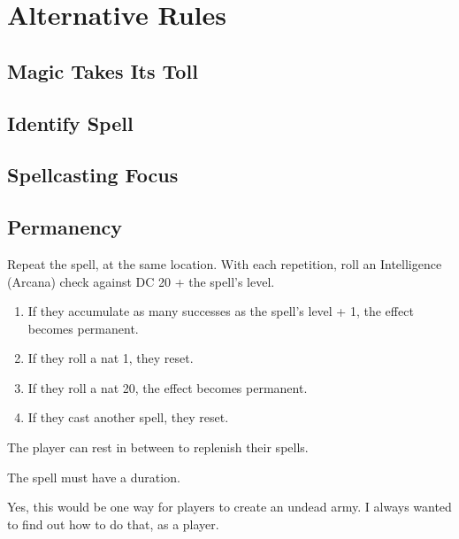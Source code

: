 \documentclass[twocolumn]{dndbook}
\begin{document}
\section{Alternative Rules}

\subsection{Magic Takes Its Toll}

\subsection{Identify Spell}


\subsection{Spellcasting Focus}


\subsection{Permanency}


Repeat the spell, at the same location. With each repetition, roll an Intelligence (Arcana) check against DC 20 + the spell's level.
\begin{enumerate}
	\item If they accumulate as many successes as the spell's level + 1, the effect becomes permanent.
	\item If they roll a nat 1, they reset.
	\item If they roll a nat 20, the effect becomes permanent.
	\item If they cast another spell, they reset.
\end{enumerate}

The player can rest in between to replenish their spells.

The spell must have a duration.\par

Yes, this would be one way for players to create an undead army.
I always wanted to find out how to do that, as a player.\par
\end{document}
